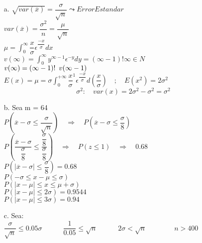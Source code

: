 \documentclass[10pt,a4paper]{article}
\begin{document}
\begin{itemize}
\item[a.]
$\sqrt{var(\overline{x})} = \dfrac{\sigma}{\sqrt{n}} \leadsto Error Estandar$\\
\newline
$var(\overline{x})= \dfrac{\sigma^2}{n} = \dfrac{\mu}{\sqrt{n}} $\\
\newline
$\mu = \int_{0}^{\infty} \dfrac{x}{\sigma}\epsilon^{\dfrac{-x}{\sigma}} dx $\\
\newline
$v(\infty) = \int_{0}^{\infty} y^{\infty-1}\epsilon^{-y}dy = (\infty-1)! \infty \in N$\\
\newline
$v(\infty) = (\infty-1)! \enskip v(\infty-1)$\\
\newline
$E(x)= \mu = \sigma\int_{0}^{+\infty} \dfrac{x}{\sigma}^1 \epsilon^{\dfrac{-x}{\sigma}} d(\dfrac{x}{\sigma}) \quad ; \quad E(x^2)=2\sigma^2$\\
\newline
$$\sigma^2:\quad var(x)=2\sigma^2 - \sigma^2 = \sigma^2 $$
\item[b. ]
Sea m = 64\\
\newline
$P(\overline{x}-\sigma \leq \dfrac{\sigma}{\sqrt{n}})\quad\Rightarrow\quad P(\overline{x}-\sigma \leq \dfrac{\sigma}{8})$\\
\newline
$P(\dfrac{\overline{x}-\sigma}{\dfrac{\sigma}{8}} \leq \dfrac{\dfrac{\sigma}{8}}{\dfrac{\sigma}{8}})\quad\Rightarrow\quad P(z \leq 1)\quad\Rightarrow\quad 0.68$\\
\newline
$P(|\overline{x}-\sigma|\leq \dfrac{\sigma}{8}) = 0.68$\\
\newline
$P(-\sigma \leq {x-\mu} \leq \sigma)$\\
\newline
$P(|x-\mu| \leq x \leq \mu+\sigma)$\\
\newline
$P(|x-\mu| \leq 2\sigma) = 0.9544$\\
\newline
$P(|x-\mu| \leq 3\sigma) = 0.94$\\
\item[c.]
Sea:\\
\newline
$\dfrac{\sigma}{\sqrt{n}} \leq 0.05\sigma \quad\quad\quad \dfrac{1}{0.05}\leq \sqrt{n} \quad\quad\quad2\sigma < \sqrt{n} \quad\quad\quad\quad n>400$
\end{itemize}
\end{document}
